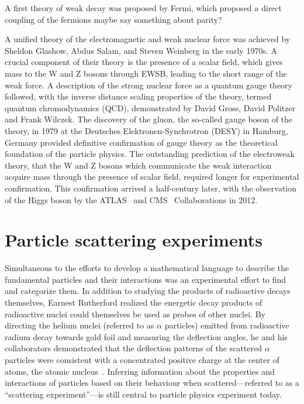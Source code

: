 A first theory of weak decay was proposed by Fermi, which proposed
a direct coupling of the fermions
maybe say something about parity?

A unified theory of the electromagnetic and weak nuclear force was achieved
by Sheldon Glashow, Abdus Salam, and Steven Weinberg in the early 1970s.
A crucial component of their theory is the presence of a scalar field, 
which gives mass to the W and Z bosons through EWSB, leading to the 
short range of the weak force.
A description of the strong nuclear force as a quantum 
gauge theory followed,
with the inverse distance scaling properties of the theory,
termed quantum chromodynamics (QCD), demonstrated by
David Gross, David Politzer and Frank Wilczek.
The discovery of the gluon, the so-called gauge boson of the theory,
in 1979 at the Deutsches Elektronen-Synchrotron (DESY) in Hamburg, Germany
provided definitive confirmation
of gauge theory as the theoretical foundation of the particle physics.
The outstanding prediction of the 
electroweak theory, that the W and Z bosons which communicate the weak 
interaction acquire mass through the presence of scalar field, required
longer for experimental confirmation. This confirmation arrived a half-century
later, with the observation of the Higgs boson by the 
ATLAS~\cite{Aad:2012tfa} and CMS~\cite{Chatrchyan:2012xdj,Chatrchyan:2013lba} Collaborations
in 2012.

\section{Particle scattering experiments}

Simultaneous to the efforts to develop a mathematical language to describe 
the fundamental particles and their interactions was an experimental effort 
to find and categorize them. 
In addition to studying the products of radioactive decays themselves, 
Earnest Rutherford realized the energetic decay products of
radioactive nuclei could 
themselves be used as probes of other nuclei.
By directing the 
helium nuclei (referred to as $\alpha$ particles) emitted from radioactive radium decay towards gold foil
and measuring the deflection
angles, he and his collaborators demonstrated that the deflection
patterns of the scattered $\alpha$ particles were consistent with 
a concentrated positive charge at the center of atoms,
the atomic nucleus~\cite{Rutherford:1911zz}.
Inferring information about the properties and interactions of particles based on their
behaviour when scattered---referred to as a ``scattering experiment''---is still central 
to particle physics experiment today.

